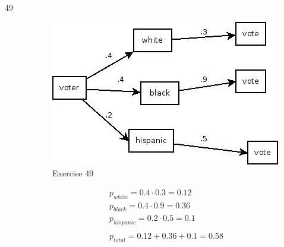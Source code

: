 \documentclass[letterpaper]{exam}
\begin{document}
\begin{description}


    \item[49]
      \begin{figure}[H]
        \centering
        \includegraphics[scale = 0.4]{ex49.jpg}
        \caption{Exercise 49}
      \end{figure}

      \begin{align*}
        p_{white} = 0.4 \cdot 0.3 = 0.12 \\
        p_{black} = 0.4 \cdot 0.9 = 0.36 \\
        p_{hispanic} = 0.2 \cdot 0.5 = 0.1 \\
        \\
        p_{total} = 0.12 + 0.36 + 0.1 = \boxed{ 0.58 } \\
      \end{align*}




\end{description}
\end{document}
